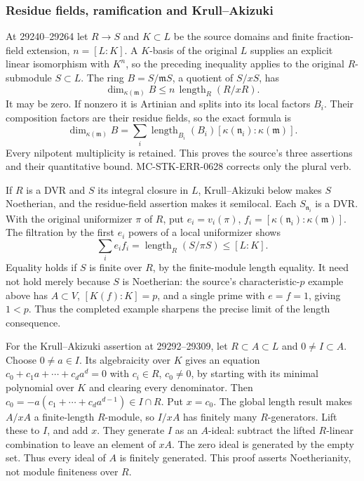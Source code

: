 \subsubsection{Residue fields, ramification and Krull--Akizuki}\label{algebra-proof-028-residue-fields-ramification-and-krullakizuki}

At 29240--29264 let \(R\to S\) and \(K\subset L\) be the source domains and finite fraction-field extension, \(n=[L:K]\). A \(K\)-basis of the original \(L\) supplies an explicit linear isomorphism with \(K^n\), so the preceding inequality applies to the original \(R\)-submodule \(S\subset L\). The ring \(B=S/\mathfrak mS\), a quotient of \(S/xS\), has \[
 \dim_{\kappa(\mathfrak m)}B
 \le n\,\operatorname{length}_R(R/xR).
\] It may be zero. If nonzero it is Artinian and splits into its local factors \(B_i\). Their composition factors are their residue fields, so the exact formula is \[
 \dim_{\kappa(\mathfrak m)}B
 =\sum_i \operatorname{length}_{B_i}(B_i)
          [\kappa(\mathfrak n_i):\kappa(\mathfrak m)].
\] Every nilpotent multiplicity is retained. This proves the source's three assertions and their quantitative bound. MC-\AlgebraIdentifierBreak{}STK-\AlgebraIdentifierBreak{}ERR-\AlgebraIdentifierBreak{}0628 corrects only the plural verb.

If \(R\) is a DVR and \(S\) its integral closure in \(L\), Krull--Akizuki below makes \(S\) Noetherian, and the residue-field assertion makes it semilocal. Each \(S_{\mathfrak n_i}\) is a DVR. With the original uniformizer \(\pi\) of \(R\), put \(e_i=v_i(\pi)\), \(f_i=[\kappa(\mathfrak n_i):\kappa(\mathfrak m)]\). The filtration by the first \(e_i\) powers of a local uniformizer shows \[
 \sum_i e_i f_i
 =\operatorname{length}_R(S/\pi S)\le [L:K].
\] Equality holds if \(S\) is finite over \(R\), by the finite-module length equality. It need not hold merely because \(S\) is Noetherian: the source's characteristic-\(p\) example above has \(A\subset V\), \([K(f):K]=p\), and a single prime with \(e=f=1\), giving \(1<p\). Thus the completed example sharpens the precise limit of the length consequence.

For the Krull--Akizuki assertion at 29292--29309, let \(R\subset A\subset L\) and \(0\ne I\subset A\). Choose \(0\ne a\in I\). Its algebraicity over \(K\) gives an equation \(c_0+c_1a+\cdots+c_da^d=0\) with \(c_i\in R\), \(c_0\ne0\), by starting with its minimal polynomial over \(K\) and clearing every denominator. Then \(c_0=-a(c_1+\cdots+c_da^{d-1})\in I\cap R\). Put \(x=c_0\). The global length result makes \(A/xA\) a finite-length \(R\)-module, so \(I/xA\) has finitely many \(R\)-generators. Lift these to \(I\), and add \(x\). They generate \(I\) as an \(A\)-ideal: subtract the lifted \(R\)-linear combination to leave an element of \(xA\). The zero ideal is generated by the empty set. Thus every ideal of \(A\) is finitely generated. This proof asserts Noetherianity, not module finiteness over \(R\).


